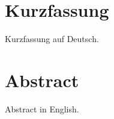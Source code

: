
{%
	\chapter*{Kurzfassung}
	
	Kurzfassung auf Deutsch.
}

{%
	\chapter*{Abstract}
	
	Abstract in English.
}
